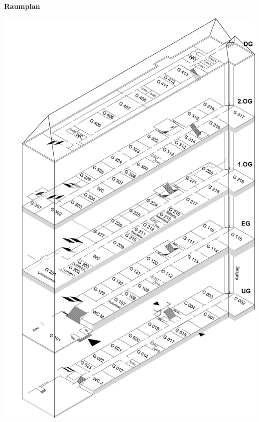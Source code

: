 \documentclass[12pt]{article}
\begin{document}
\begin{minipage}{.4\textwidth}
    \vspace{-10mm}
    \begin{center}
    \textbf{\LARGE Raumplan}\\
    \end{center}
    \vspace{5mm}
    \includegraphics[height=.8\textheight]{gebaude_plan.pdf}
\end{minipage}
\end{document}
